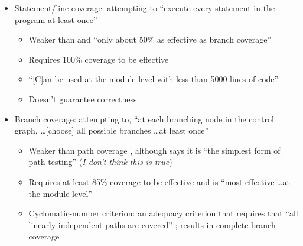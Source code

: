 \begin{itemize}
      \item Statement/line coverage: attempting to ``execute every statement in
            the program at least once'' \citep[p.~119]{Patton2006}
            \begin{itemize}
                  \item Weaker than \citep[p.~421]{vanVliet2000} and
                        ``only about 50\% as effective as branch coverage''
                        \citep[p.~481]{PetersAndPedrycz2000}
                  \item Requires 100\% coverage to be effective
                        \citep[p.~481]{PetersAndPedrycz2000}
                  \item ``[C]an be used at the module level with less than 5000
                        lines of code'' \citep[p.~481]{PetersAndPedrycz2000}
                  \item Doesn't guarantee correctness
                        \citep[p.~421]{vanVliet2000}
            \end{itemize}
      \item Branch coverage: attempting to, ``at each branching node in the
            control graph, \dots [choose] all possible branches \dots at least
            once'' \citep[p.~421]{vanVliet2000}
            \begin{itemize}
                  \item Weaker than path coverage
                        \citep[p.~433]{vanVliet2000}, although
                        \citep[p.~119]{Patton2006} says it is
                        ``the simplest form of path testing''
                        (\emph{I don't think this is true})
                  \item Requires at least 85\% coverage to be effective and is
                        ``most effective \dots at the module level''
                        \citep[p.~481]{PetersAndPedrycz2000}
                  \item Cyclomatic-number criterion: an adequacy criterion that
                        requires that ``all linearly-independent paths are
                        covered'' \citep[p.~423]{vanVliet2000};
                        results in complete branch coverage

\end{itemize}
\end{itemize}
